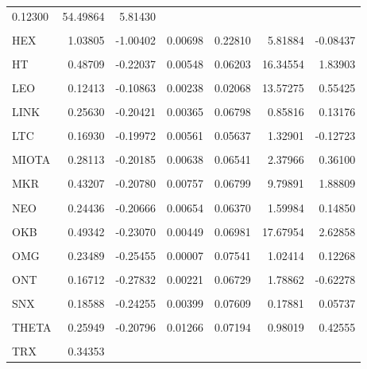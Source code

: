 \documentclass[runningheads,a4paper,10pt]{etc/llncs}
\begin{document}
\begin{longtable}{lrrrrrr}
  0.12300 &  54.49864 &  5.81430 \\\\\n  HEX &  1.03805 & -1.00402 &  0.00698 &             0.22810 &   5.81884 & -0.08437 \\\\\n   HT &  0.48709 & -0.22037 &  0.00548 &             0.06203 &  16.34554 &  1.83903 \\\\\n  LEO &  0.12413 & -0.10863 &  0.00238 &             0.02068 &  13.57275 &  0.55425 \\\\\n LINK &  0.25630 & -0.20421 &  0.00365 &             0.06798 &   0.85816 &  0.13176 \\\\\n  LTC &  0.16930 & -0.19972 &  0.00561 &             0.05637 &   1.32901 & -0.12723 \\\\\n MIOTA &  0.28113 & -0.20185 &  0.00638 &             0.06541 &   2.37966 &  0.36100 \\\\\n  MKR &  0.43207 & -0.20780 &  0.00757 &             0.06799 &   9.79891 &  1.88809 \\\\\n  NEO &  0.24436 & -0.20666 &  0.00654 &             0.06370 &   1.59984 &  0.14850 \\\\\n  OKB &  0.49342 & -0.23070 &  0.00449 &             0.06981 &  17.67954 &  2.62858 \\\\\n  OMG &  0.23489 & -0.25455 &  0.00007 &             0.07541 &   1.02414 &  0.12268 \\\\\n  ONT &  0.16712 & -0.27832 &  0.00221 &             0.06729 &   1.78862 & -0.62278 \\\\\n  SNX &  0.18588 & -0.24255 &  0.00399 &             0.07609 &   0.17881 &  0.05737 \\\\\n THETA &  0.25949 & -0.20796 &  0.01266 &             0.07194 &   0.98019 &  0.42555 \\\\\n  TRX &  0.34353 & 
\end{longtable}
\end{document}
